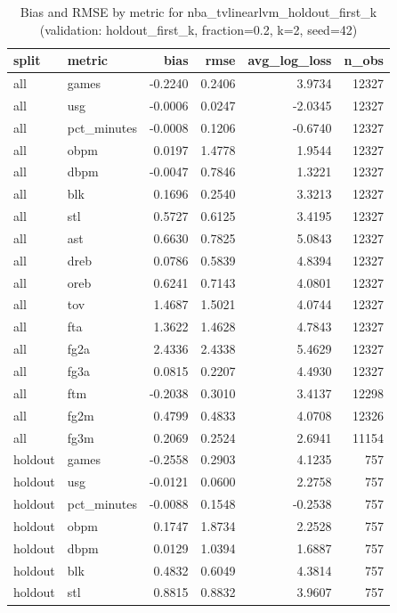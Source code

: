 \begin{table}
\caption{Bias and RMSE by metric for nba_tvlinearlvm_holdout_first_k (validation: holdout_first_k, fraction=0.2, k=2, seed=42)}
\label{tab:nba_tvlinearlvm_holdout_first_k_vs_holdout_first_k_f20_k2_s42_bias_rmse}
\begin{tabular}{llrrrr}
\toprule
split & metric & bias & rmse & avg\_log\_loss & n\_obs \\
\midrule
all & games & -0.2240 & 0.2406 & 3.9734 & 12327 \\
all & usg & -0.0006 & 0.0247 & -2.0345 & 12327 \\
all & pct\_minutes & -0.0008 & 0.1206 & -0.6740 & 12327 \\
all & obpm & 0.0197 & 1.4778 & 1.9544 & 12327 \\
all & dbpm & -0.0047 & 0.7846 & 1.3221 & 12327 \\
all & blk & 0.1696 & 0.2540 & 3.3213 & 12327 \\
all & stl & 0.5727 & 0.6125 & 3.4195 & 12327 \\
all & ast & 0.6630 & 0.7825 & 5.0843 & 12327 \\
all & dreb & 0.0786 & 0.5839 & 4.8394 & 12327 \\
all & oreb & 0.6241 & 0.7143 & 4.0801 & 12327 \\
all & tov & 1.4687 & 1.5021 & 4.0744 & 12327 \\
all & fta & 1.3622 & 1.4628 & 4.7843 & 12327 \\
all & fg2a & 2.4336 & 2.4338 & 5.4629 & 12327 \\
all & fg3a & 0.0815 & 0.2207 & 4.4930 & 12327 \\
all & ftm & -0.2038 & 0.3010 & 3.4137 & 12298 \\
all & fg2m & 0.4799 & 0.4833 & 4.0708 & 12326 \\
all & fg3m & 0.2069 & 0.2524 & 2.6941 & 11154 \\
holdout & games & -0.2558 & 0.2903 & 4.1235 & 757 \\
holdout & usg & -0.0121 & 0.0600 & 2.2758 & 757 \\
holdout & pct\_minutes & -0.0088 & 0.1548 & -0.2538 & 757 \\
holdout & obpm & 0.1747 & 1.8734 & 2.2528 & 757 \\
holdout & dbpm & 0.0129 & 1.0394 & 1.6887 & 757 \\
holdout & blk & 0.4832 & 0.6049 & 4.3814 & 757 \\
holdout & stl & 0.8815 & 0.8832 & 3.9607 & 757 \\

\end{tabular}
\end{table}
